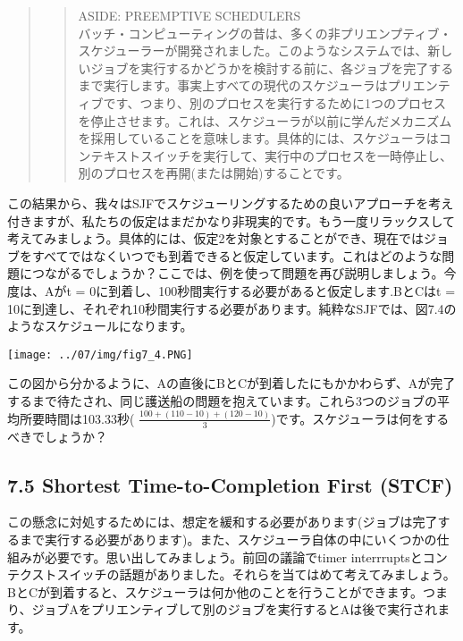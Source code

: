 \begin{quote}
\begin{quote}
ASIDE: PREEMPTIVE SCHEDULERS\\
バッチ・コンピューティングの昔は、多くの非プリエンプティブ・スケジューラーが開発されました。このようなシステムでは、新しいジョブを実行するかどうかを検討する前に、各ジョブを完了するまで実行します。事実上すべての現代のスケジューラはプリエンティブです、つまり、別のプロセスを実行するために1つのプロセスを停止させます。これは、スケジューラが以前に学んだメカニズムを採用していることを意味します。具体的には、スケジューラはコンテキストスイッチを実行して、実行中のプロセスを一時停止し、別のプロセスを再開(または開始)することです。
\end{quote}
\end{quote}

この結果から、我々はSJFでスケジューリングするための良いアプローチを考え付きますが、私たちの仮定はまだかなり非現実的です。もう一度リラックスして考えてみましょう。具体的には、仮定2を対象とすることができ、現在ではジョブをすべてではなくいつでも到着できると仮定しています。これはどのような問題につながるでしょうか？ここでは、例を使って問題を再び説明しましょう。今度は、Aがt
= 0に到着し、100秒間実行する必要があると仮定します.BとCはt =
10に到達し、それぞれ10秒間実行する必要があります。純粋なSJFでは、図7.4のようなスケジュールになります。

\texttt{[image: ../07/img/fig7\_4.PNG]}

この図から分かるように、Aの直後にBとCが到着したにもかかわらず、Aが完了するまで待たされ、同じ護送船の問題を抱えています。これら3つのジョブの平均所要時間は103.33秒(
\(\frac{100+(110−10)+(120−10)}{3}\))です。スケジューラは何をするべきでしょうか？

\hypertarget{shortest-time-to-completion-first-stcf}{%
\subsection*{7.5 Shortest Time-to-Completion First
(STCF)}\label{shortest-time-to-completion-first-stcf}}

この懸念に対処するためには、想定を緩和する必要があります(ジョブは完了するまで実行する必要があります)。また、スケジューラ自体の中にいくつかの仕組みが必要です。思い出してみましょう。前回の議論でtimer
interrruptsとコンテクストスイッチの話題がありました。それらを当てはめて考えてみましょう。BとCが到着すると、スケジューラは何か他のことを行うことができます。つまり、ジョブAをプリエンティブして別のジョブを実行するとAは後で実行されます。


